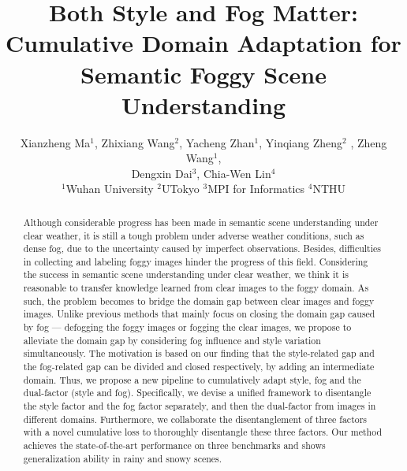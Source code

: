\documentclass[10pt,twocolumn,letterpaper]{article}
\begin{document}
\title{Both Style and Fog Matter:\\Cumulative Domain Adaptation for Semantic Foggy Scene Understanding}

\author{Xianzheng Ma$^1$, \hspace{1mm}Zhixiang Wang$^2$, \hspace{1mm}Yacheng Zhan$^1$, \hspace{1mm}Yinqiang Zheng$^2$ , \hspace{1mm}Zheng Wang$^1$, \\Dengxin Dai$^3$, \hspace{1mm}Chia-Wen Lin$^4$\\
$^1$Wuhan University  \hspace{3mm}  $^2$UTokyo  \hspace{3mm}  $^3$MPI for Informatics  \hspace{3mm}  $^4$NTHU\\




}
\maketitle

\begin{abstract}
Although considerable progress has been made in semantic scene understanding under clear weather, it is still a tough problem under adverse weather conditions, such as dense fog, due to the uncertainty caused by imperfect observations. Besides, difficulties in collecting and labeling foggy images hinder the progress of this field.
Considering the success in semantic scene understanding under clear weather, we think it is reasonable to transfer knowledge learned from clear images to the foggy domain. As such, the problem becomes to bridge the domain gap between clear images and foggy images. 
Unlike previous methods that mainly focus on closing the domain gap caused by fog --- defogging the foggy images or fogging the clear images, we propose to alleviate the domain gap by considering fog influence and style variation simultaneously. 
The motivation is based on our finding that the style-related gap and the fog-related gap can be divided and closed respectively, by adding an intermediate domain.
Thus, we propose a new pipeline to cumulatively adapt style, fog and the dual-factor (style and fog). Specifically, we devise a unified framework to disentangle the style factor and the fog factor separately, and then the dual-factor from images in different domains. 
Furthermore, we collaborate the disentanglement of three factors with a novel cumulative loss to thoroughly disentangle these three factors. 
Our method achieves the state-of-the-art performance on three benchmarks and shows generalization ability in rainy and snowy scenes.
\end{abstract}
\end{document}
